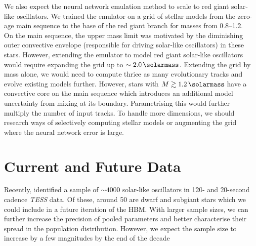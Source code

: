 We also expect the neural network emulation method to scale to red giant solar-like oscillators. We trained the emulator on a grid of stellar models from the zero-age main sequence to the base of the red giant branch for masses from \SIrange{0.8}{1.2}{\solarmass}. On the main sequence, the upper mass limit was motivated by the diminishing outer convective envelope (responsible for driving solar-like oscillators) in these stars. However, extending the emulator to model red giant solar-like oscillators would require expanding the grid up to \(\sim\SI{2.0}{\solarmass}\). Extending the grid by mass alone, we would need to compute thrice as many evolutionary tracks and evolve existing models further. However, stars with \(M \gtrsim \SI{1.2}{\solarmass}\) have a convective core on the main sequence which introduces an additional model uncertainty from mixing at its boundary. Parametrising this would further multiply the number of input tracks. To handle more dimensions, we should research ways of selectively computing stellar models or augmenting the grid where the neural network error is large.


\section{Current and Future Data}

Recently, \citet{Hatt.Nielsen.ea2023} identified a sample of \(\sim 4000\) solar-like oscillators in 120- and 20-second cadence \emph{TESS} data. Of these, around 50  are dwarf and subgiant stars which we could include in a future iteration of the HBM. With larger sample sizes, we can further increase the precision of pooled parameters and better characterise their spread in the population distribution. However, we expect the sample size to increase by a few magnitudes by the end of the decade


